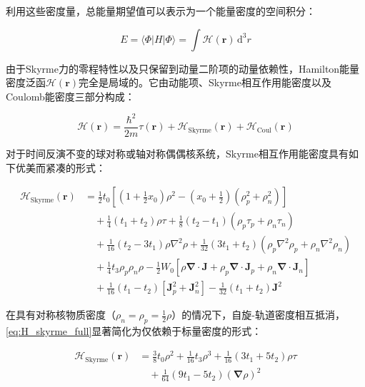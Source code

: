 利用这些密度量，总能量期望值可以表示为一个能量密度的空间积分：

\begin{equation}
E=\langle\Phi|H|\Phi\rangle=\int\mathcal{H}(\boldsymbol{r})\,\mathrm{d}^{3}r\label{eq:skyrme_E_integral}
\end{equation}

由于Skyrme力的零程特性以及只保留到动量二阶项的动量依赖性，Hamilton能量密度泛函$\mathcal{H}(\boldsymbol{r})$完全是局域的。它由动能项、Skyrme相互作用能密度以及Coulomb能密度三部分构成：

\begin{equation}
\mathcal{H}(\boldsymbol{r})=\frac{\hbar^{2}}{2m}\tau(\boldsymbol{r})+\mathcal{H}_{\mathrm{Skyrme}}(\boldsymbol{r})+\mathcal{H}_{\mathrm{Coul}}(\boldsymbol{r})\label{eq:skyrme_H_density}
\end{equation}

对于时间反演不变的球对称或轴对称偶偶核系统，Skyrme相互作用能密度具有如下优美而紧凑的形式：

\begin{align}
\mathcal{H}_{\mathrm{Skyrme}}(\boldsymbol{r}) & =\frac{1}{2}t_{0}\left[\left(1+\frac{1}{2}x_{0}\right)\rho^{2}-\left(x_{0}+\frac{1}{2}\right)(\rho^{2}_{p}+\rho^{2}_{n})\right]\nonumber \\
 & \quad+\frac{1}{4}\left(t_{1}+t_{2}\right)\rho\tau+\frac{1}{8}\left(t_{2}-t_{1}\right)(\rho_{p}\tau_{p}+\rho_{n}\tau_{n})\nonumber \\
 & \quad+\frac{1}{16}\left(t_{2}-3t_{1}\right)\rho\nabla^{2}\rho+\frac{1}{32}\left(3t_{1}+t_{2}\right)(\rho_{p}\nabla^{2}\rho_{p}+\rho_{n}\nabla^{2}\rho_{n})\nonumber \\
 & \quad+\frac{1}{4}t_{3}\rho_{p}\rho_{n}\rho-\frac{1}{2}W_{0}\left[\rho\boldsymbol{\nabla}\cdot\boldsymbol{J}+\rho_{p}\boldsymbol{\nabla}\cdot\boldsymbol{J}_{p}+\rho_{n}\boldsymbol{\nabla}\cdot\boldsymbol{J}_{n}\right]\nonumber \\
 & \quad+\frac{1}{16}\left(t_{1}-t_{2}\right)\left[\boldsymbol{J}^{2}_{p}+\boldsymbol{J}^{2}_{n}\right]-\frac{1}{32}\left(t_{1}+t_{2}\right)\boldsymbol{J}^{2}\label{eq:H_skyrme_full}
\end{align}

在具有对称核物质密度（$\rho_{n}=\rho_{p}=\frac{1}{2}\rho$）的情况下，自旋-轨道密度相互抵消，\ref{eq:H_skyrme_full}显著简化为仅依赖于标量密度的形式：

\begin{align}
\mathcal{H}_{\mathrm{Skyrme}}(\boldsymbol{r}) & =\frac{3}{8}t_{0}\rho^{2}+\frac{1}{16}t_{3}\rho^{3}+\frac{1}{16}\left(3t_{1}+5t_{2}\right)\rho\tau\nonumber \\
 & \quad+\frac{1}{64}\left(9t_{1}-5t_{2}\right)(\boldsymbol{\nabla}\rho)^{2}\label{eq:H_skyrme_symm}
\end{align}

